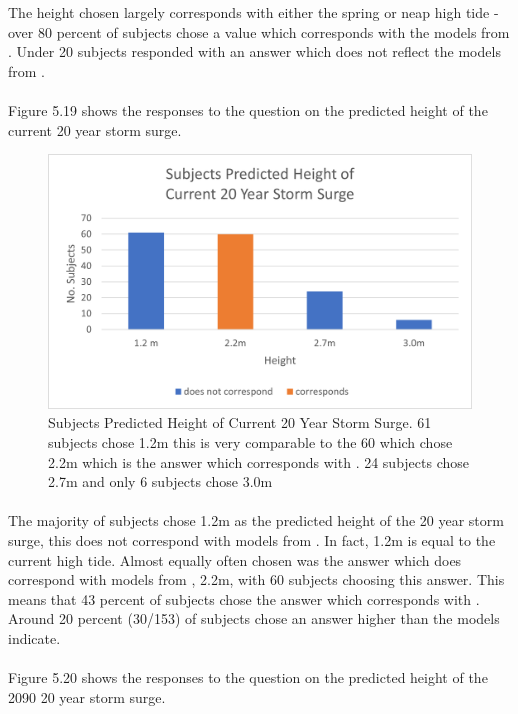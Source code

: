 The height chosen largely corresponds with either the spring or neap high tide - over 80 percent of subjects chose a value which corresponds with the models from \cite{kartverket_se_2020}. Under 20 subjects responded with an answer which does not reflect the models from \cite{kartverket_se_2021}. 
\paragraph{}
Figure 5.19 shows the responses to the question on the predicted height of the current 20 year storm surge. 
\begin{figure}[H]
    \centering
    \includegraphics{fig_results/2022-20yrss-answer.png}
    \caption{Subjects Predicted Height of Current 20 Year Storm Surge. 61 subjects chose 1.2m this is very comparable to the 60 which chose 2.2m which is the answer which corresponds with \cite{kartverket_se_2021}. 24 subjects chose 2.7m and only 6 subjects chose 3.0m}
    \label{fig:2022-stormsurge-answers}
\end{figure}
\paragraph{}
The majority of subjects chose 1.2m as the predicted height of the 20 year storm surge, this does not correspond with models from \cite{kartverket_se_2021}. In fact, 1.2m is equal to the current high tide. Almost equally often chosen was the answer which does correspond with models from \cite{kartverket_se_2021}, 2.2m, with 60 subjects choosing this answer. This means that 43 percent of subjects chose the answer which corresponds with \cite{kartverket_se_2021}. Around 20 percent (30/153) of subjects chose an answer higher than the models indicate.
\paragraph{}
Figure 5.20 shows the responses to the question on the predicted height of the 2090 20 year storm surge.

